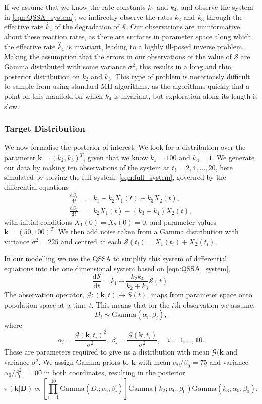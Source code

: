 \documentclass[final]{siamltex}
\begin{document}
If we assume that we know the rate constants $k_1$ and $k_4$, and
observe the system in \eqref{eqn:QSSA_system}, we indirectly
observe the rates $k_2$ and $k_3$ through the effective rate
$\hat{k}_4$ of the degradation of $\mathcal{S}$. Our
observations are uninformative about these reaction rates, as there
are surfaces in parameter space along which the effective rate
$\hat{k}_4$ is invariant, leading to a highly ill-posed inverse
problem. Making the assumption that the errors in our observations of
the value of $\mathcal{S}$ are Gamma distributed with some variance
$\sigma^2$, this results in a long and thin posterior distribution on
$k_2$ and $k_3$. This type of problem is notoriously difficult to
sample from using standard MH algorithms, as the algorithms quickly
find a point on this manifold on which $\hat{k}_4$ is invariant, but
exploration along its length is slow.

\subsubsection{Target Distribution}\label{sec:345}

We now formalise the posterior of interest. We look for a distribution over the parameter $\mathbf{k} = (k_2, k_3)^T$, given that we know $k_1 = 100$ and $k_4=1$. We generate our data by making ten observations of the system at $t_i = 2, 4, \dots, 20$, here simulated by solving the full system, \eqref{eqn:full_system}, governed by the differential equations
\begin{align*}
	\frac{\text{d}S_1}{\text{d}t} &= k_1 - k_2X_1(t)+k_3X_2(t), \\
	\frac{\text{d}S_2}{\text{d}t} &= k_2X_1(t) - (k_3+k_4)X_2(t),
\end{align*}
with initial conditions $X_1(0)=X_2(0) = 0$, and parameter values $\mathbf{k} = (50, 100)^T$. We then add noise taken from a Gamma distribution with variance $\sigma^2 = 225$ and centred at each $\mathcal{S}(t_i)=X_1(t_i)+X_2(t_i)$.

In our modelling we use the QSSA to simplify this system of differential equations into the one dimensional system based on \eqref{eqn:QSSA_system},
\[
	\frac{\text{d}\mathcal{S}}{\text{d}t} = k_1 - \frac{k_2k_4}{k_2+k_3}\mathcal{S}(t).
\]
The observation operator, $\mathcal{G}: (\mathbf{k},t) \mapsto S(t)$, maps from parameter space onto population space at a time $t$. This means that for the $i$th observation we assume,
\[
	 D_i \sim \text{Gamma}(\alpha_i, \beta_i),
\]
where
\[
	 \alpha_i = \frac{\mathcal{G}(\mathbf{k}, t_i)^2}{\sigma^2},\  \beta_i = \frac{\mathcal{G}(\mathbf{k}, t_i)}{\sigma^2}, \quad i = 1, \dots, 10.
\]
These are parameters required to give us a distribution with mean
$\mathcal{G}(\mathbf{k}$ and variance $\sigma^2$.
We assign Gamma priors to $\mathbf{k}$ with mean $\alpha_0/\beta_0 =
75$ and variance $\alpha_0/\beta_0^2 = 100$ in both coordinates, resulting in the posterior
\[
	\pi(\mathbf{k}|\mathbf{D}) \propto \left[\prod\limits_{i=1}^{10} \text{Gamma}(D_i; \alpha_i, \beta_i)\right]\text{Gamma}(k_2; \alpha_0, \beta_0)\text{Gamma}(k_3; \alpha_0, \beta_0).
\]
\end{document}
